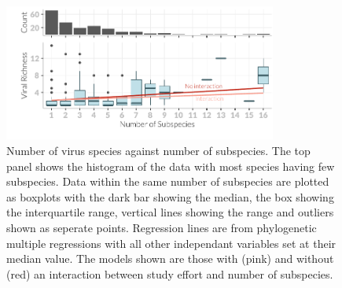 		
		























\begin{knitrout}\footnotesize
{}\color{fgcolor}\begin{figure}[t]

{\centering \includegraphics[width=0.8\textwidth]{figure/boxplot-1} 

}

\caption[Number of virus species against number of subspecies]{Number of virus species against number of subspecies. 		
The top panel shows the histogram of the data with most species having few subspecies.		
Data within the same number of subspecies are plotted as boxplots with the dark bar showing the median, the box showing the interquartile range, vertical lines showing the range and outliers shown as seperate points.		
Regression lines are from phylogenetic multiple regressions with all other independant variables set at their median value.		
The models shown are those with (pink) and without (red) an interaction between study effort and number of subspecies.		
}\label{fig:boxplot}
\end{figure}


\end{knitrout}



